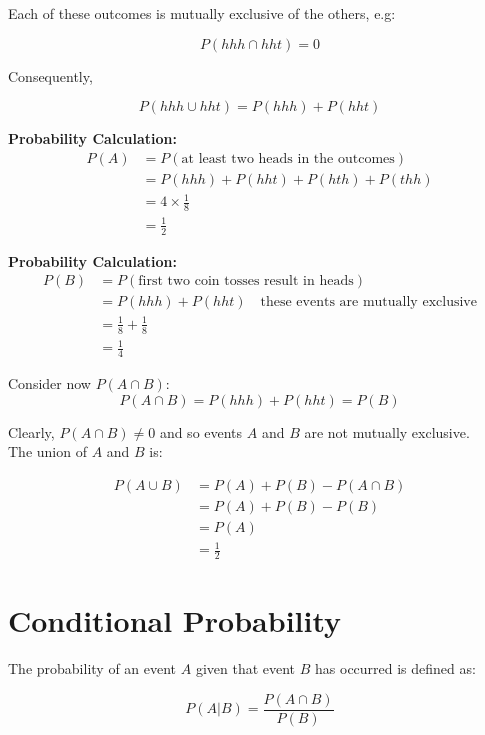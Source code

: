 \documentclass[12pt]{book}
\theoremstyle{definition}
\begin{document}
Each of these outcomes is mutually exclusive of the others, e.g:

\[
P(hhh \cap hht) = 0
\]

Consequently,

\[
P(hhh \cup hht) = P(hhh) + P(hht) 
\]

\textbf{Probability Calculation:}
\begin{align*}
P(A) &= P(\text{at least two heads in the outcomes}) \\
& = P(hhh) + P(hht) + P(hth) + P(thh) \\
& = 4 \times \frac{1}{8} \\
& = \frac{1}{2}
\end{align*}


\textbf{Probability Calculation:}
\begin{align*}
P(B) &= P(\text{first two coin tosses result in heads}) \\
&= P(hhh) + P(hht) \quad \text{these events are mutually exclusive}\\
&= \frac{1}{8} + \frac{1}{8} \\
&= \frac{1}{4}
\end{align*}

Consider now \(P(A \cap B)\):
\[
P(A \cap B) = P(hhh) + P(hht) = P(B)
\]

Clearly, \(P(A \cap B) \ne 0\) and so events \(A\) and \(B\) are not mutually exclusive. \\

The union of \(A\) and \(B\) is:

\[
\begin{aligned}
    P(A \cup B) & = P(A) + P(B) - P(A \cap B)\\
        & = P(A) + P(B) - P(B) \\
        & = P(A) \\
        & = \frac{1}{2}
\end{aligned}
\]







\section{Conditional Probability}
The probability of an event \(A\) given that event \(B\) has occurred is defined as:

\[
P(A | B) = \frac{P(A \cap B)}{P(B)}
\]
\end{document}
